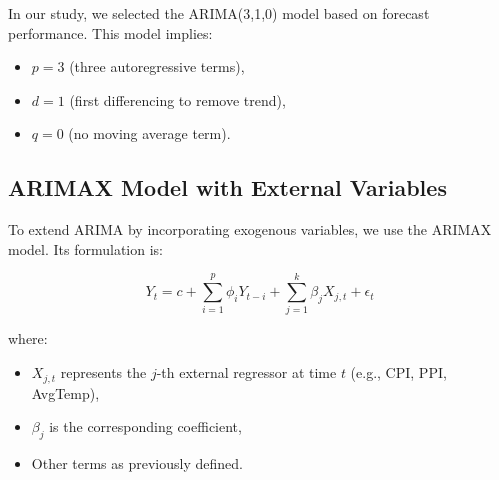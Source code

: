 In our study, we selected the ARIMA(3,1,0) model based on forecast performance. This model implies:
\begin{itemize}
    \item $p = 3$ (three autoregressive terms),
    \item $d = 1$ (first differencing to remove trend),
    \item $q = 0$ (no moving average term).
\end{itemize}

\subsection{ARIMAX Model with External Variables}

To extend ARIMA by incorporating exogenous variables, we use the ARIMAX model. Its formulation is:

\begin{equation}
Y_t = c + \sum_{i=1}^{p} \phi_i Y_{t-i} + \sum_{j=1}^{k} \beta_j X_{j,t} + \epsilon_t
\end{equation}

where:
\begin{itemize}
    \item $X_{j,t}$ represents the $j$-th external regressor at time $t$ (e.g., CPI, PPI, AvgTemp),
    \item $\beta_j$ is the corresponding coefficient,
    \item Other terms as previously defined.
\end{itemize}

